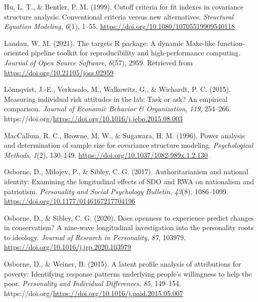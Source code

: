 \documentclass[
  man,floatsintext]{apa6}
\newlength{\cslhangindent}
\newlength{\cslentryspacingunit} %
\newenvironment{CSLReferences}[2] %
 {%
  \setlength{\parindent}{0pt}
  \ifodd #1
  \let\oldpar\par
  \def\par{\hangindent=\cslhangindent\oldpar}
  \fi
  \setlength{\parskip}{#2\cslentryspacingunit}
 }%
 {}
\begin{document}
\begin{CSLReferences}{1}{0}
\leavevmode{}%
Hu, L. T., \& Bentler, P. M. (1999). Cutoff criteria for fit indexes in covariance structure analysis: Conventional criteria versus new alternatives. \emph{Structural Equation Modeling}, \emph{6}(1), 1--55. \url{https://doi.org/10.1080/10705519909540118}

\leavevmode{}%
Landau, W. M. (2021). The targets {R} package: A dynamic {M}ake-like function-oriented pipeline toolkit for reproducibility and high-performance computing. \emph{Journal of Open Source Software}, \emph{6}(57), 2959. Retrieved from \url{https://doi.org/10.21105/joss.02959}

\leavevmode{}%
Lönnqvist, J.-E., Verkasalo, M., Walkowitz, G., \& Wichardt, P. C. (2015). Measuring individual risk attitudes in the lab: Task or ask? An empirical comparison. \emph{Journal of Economic Behavior \& Organization}, \emph{119}, 254--266. https://doi.org/\url{https://doi.org/10.1016/j.jebo.2015.08.003}

\leavevmode{}%
MacCallum, R. C., Browne, M. W., \& Sugawara, H. M. (1996). Power analysis and determination of sample size for covariance structure modeling. \emph{Psychological Methods}, \emph{1}(2), 130--149. \url{https://doi.org/10.1037/1082-989x.1.2.130}

\leavevmode{}%
Osborne, D., Milojev, P., \& Sibley, C. G. (2017). Authoritarianism and national identity: Examining the longitudinal effects of SDO and RWA on nationalism and patriotism. \emph{Personality and Social Psychology Bulletin}, \emph{43}(8), 1086--1099. \url{https://doi.org/10.1177/0146167217704196}

\leavevmode{}%
Osborne, D., \& Sibley, C. G. (2020). Does openness to experience predict changes in conservatism? A nine-wave longitudinal investigation into the personality roots to ideology. \emph{Journal of Research in Personality}, \emph{87}, 103979. \url{https://doi.org/10.1016/j.jrp.2020.103979}

\leavevmode{}%
Osborne, D., \& Weiner, B. (2015). A latent profile analysis of attributions for poverty: Identifying response patterns underlying people's willingness to help the poor. \emph{Personality and Individual Differences}, \emph{85}, 149--154. https://doi.org/\url{https://doi.org/10.1016/j.paid.2015.05.007}


\end{CSLReferences}
\end{document}
